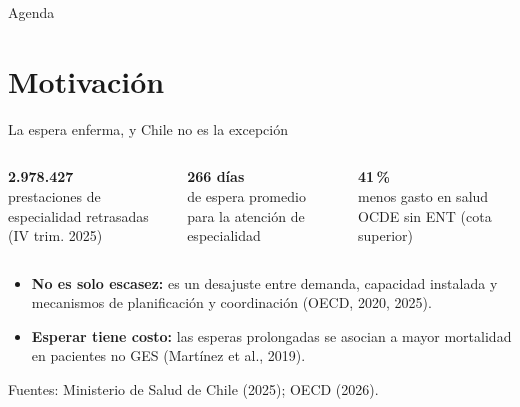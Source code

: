 \documentclass[aspectratio=169,11pt,xcolor=table]{beamer}
\newcommand{\bignum}[2]{%
  \begin{minipage}[t]{\linewidth}\centering
    {\Huge\bfseries\color{ucnavy}#1}\\[4pt]
    {\small #2}
  \end{minipage}}
\begin{document}
{
\begin{frame}{Agenda}
  \tableofcontents
\end{frame}
}

\section{Motivación}

\begin{frame}{La espera enferma, y Chile no es la excepción}
  \begin{columns}[T]
    \bignum{2.978.427}{prestaciones de especialidad retrasadas (IV trim. 2025)}
    \bignum{266 días}{de espera promedio para la atención de especialidad}
    \bignum{41\,\%}{menos gasto en salud OCDE sin ENT (cota superior)}
  \end{columns}
  \vspace{1.2em}
  \begin{itemize}
    \item<2-> \textbf{No es solo escasez:} es un desajuste entre demanda, capacidad instalada
      y mecanismos de planificación y coordinación (OECD, 2020, 2025).
    \item<3-> \textbf{Esperar tiene costo:} las esperas prolongadas se asocian a mayor
      mortalidad en pacientes no GES (Martínez et al., 2019).
  \end{itemize}
  \vfill
  {\scriptsize Fuentes: Ministerio de Salud de Chile (2025); OECD (2026).}
\end{frame}
\end{document}
